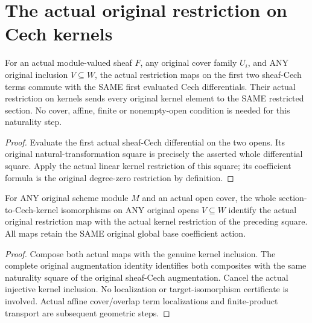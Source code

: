 \section{The actual original restriction on Cech kernels}

\begin{lemma}
\label{lem:sheaf-cech-kernel-restriction-square}
\leanok
{}
For an actual module-valued sheaf $F$, any original cover family
$U_i$, and ANY original inclusion $V\subseteq W$, the actual
restriction maps on the first two sheaf-Cech terms commute with
the SAME first evaluated Cech differentials. Their actual
restriction on kernels sends every original kernel element to
the SAME restricted section. No cover, affine, finite or
nonempty-open condition is needed for this naturality step.
\end{lemma}
\begin{proof}
Evaluate the first actual sheaf-Cech differential on the two
opens. Its original natural-transformation square is precisely
the asserted whole differential square. Apply the actual linear
kernel restriction of this square; its coefficient formula is
the original degree-zero restriction by definition.
\end{proof}

\begin{proposition}
\label{prop:scheme-section-kernel-restriction}
\leanok
{}
For ANY original scheme module $M$ and an actual open cover,
the whole section-to-Cech-kernel isomorphisms on ANY original
opens $V\subseteq W$ identify the actual original restriction
map with the actual kernel restriction of the preceding square.
All maps retain the SAME original global base coefficient action.
\end{proposition}
\begin{proof}
Compose both actual maps with the genuine kernel inclusion.
The complete original augmentation identity identifies both
composites with the same naturality square of the original
sheaf-Cech augmentation. Cancel the actual injective kernel
inclusion. No localization or target-isomorphism certificate
is involved. Actual affine cover/overlap term localizations
and finite-product transport are subsequent geometric steps.
\end{proof}

